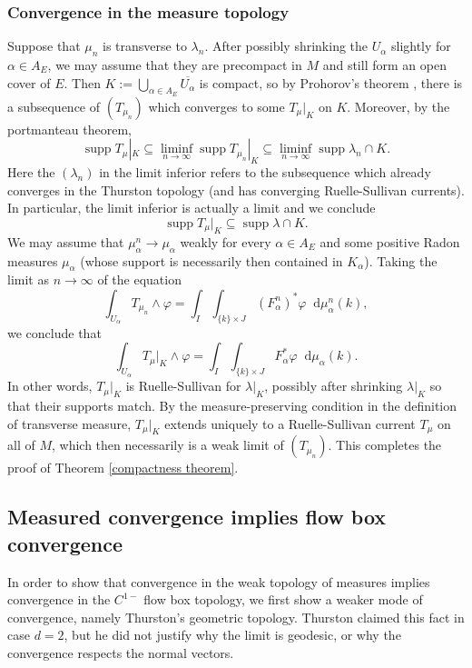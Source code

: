 \documentclass[reqno,11pt]{amsart}
\newcommand*\dif{\mathop{}\!\mathrm{d}}
\DeclareMathOperator{\supp}{supp}
\theoremstyle{definition}
\numberwithin{equation}{section}
\begin{document}
\subsubsection{Convergence in the measure topology}
Suppose that $\mu_n$ is transverse to $\lambda_n$.
After possibly shrinking the $U_\alpha$ slightly for $\alpha \in A_E$, we may assume that they are precompact in $M$ and still form an open cover of $E$.
Then $K := \bigcup_{\alpha \in A_E} \overline{U_\alpha}$ is compact, so by Prohorov's theorem \cite[Theorem 13.29]{klenke2013probability}, there is a subsequence of $(T_{\mu_n})$ which converges to some $T_\mu|_K$ on $K$.
Moreover, by the portmanteau theorem,
$$\supp T_\mu|_K \subseteq \liminf_{n \to \infty} \supp T_{\mu_n}|_K \subseteq \liminf_{n \to \infty} \supp \lambda_n \cap K.$$
Here the $(\lambda_n)$ in the limit inferior refers to the subsequence which already converges in the Thurston topology (and has converging Ruelle-Sullivan currents).
In particular, the limit inferior is actually a limit and we conclude
$$\supp T_\mu|_K \subseteq \supp \lambda \cap K.$$
We may assume that $\mu_\alpha^n \to \mu_\alpha$ weakly for every $\alpha \in A_E$ and some positive Radon measures $\mu_\alpha$ (whose support is necessarily then contained in $K_\alpha$).
Taking the limit as $n \to \infty$ of the equation 
$$\int_{U_\alpha} T_{\mu_n} \wedge \varphi = \int_I \int_{\{k\} \times J} (F_\alpha^n)^* \varphi \dif \mu_\alpha^n(k),$$
we conclude that
$$\int_{U_\alpha} T_\mu|_K \wedge \varphi = \int_I \int_{\{k\} \times J} F_\alpha^* \varphi \dif \mu_\alpha(k).$$
In other words, $T_\mu|_K$ is Ruelle-Sullivan for $\lambda|_K$, possibly after shrinking $\lambda|_K$ so that their supports match.
By the measure-preserving condition in the definition of transverse measure, $T_\mu|_K$ extends uniquely to a Ruelle-Sullivan current $T_\mu$ on all of $M$, which then necessarily is a weak limit of $(T_{\mu_n})$.
This completes the proof of Theorem \ref{compactness theorem}.


\subsection{Measured convergence implies flow box convergence}
In order to show that convergence in the weak topology of measures implies convergence in the $C^{1-}$ flow box topology, we first show a weaker mode of convergence, namely Thurston's geometric topology.
Thurston claimed this fact \cite[Proposition 8.10.3]{thurston1979geometry} in case $d = 2$, but he did not justify why the limit is geodesic, or why the convergence respects the normal vectors.
\end{document}
